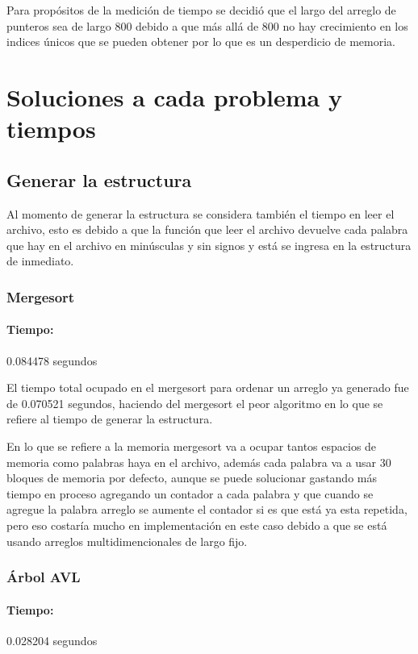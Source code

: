 \documentclass[12pt,letterpaper]{scrartcl}
\begin{document}
Para propósitos de la medición de tiempo se decidió que el largo del arreglo de punteros sea de largo 800 debido a que más allá de 800 no hay crecimiento en los indices únicos que se pueden obtener por lo que es un desperdicio de memoria.

\newpage
\section{Soluciones a cada problema y tiempos}

\subsection{Generar la estructura}

Al momento de generar la estructura se considera también el tiempo en leer el archivo, esto es debido a que la función que leer el archivo devuelve cada palabra que hay en el archivo en minúsculas y sin signos y está se ingresa en la estructura de inmediato.


\subsubsection{Mergesort}

\paragraph{Tiempo:} 0.084478 segundos

El tiempo total ocupado en el mergesort para ordenar un arreglo ya generado fue de 0.070521 segundos, haciendo del mergesort el peor algoritmo en lo que se refiere al tiempo de generar la estructura.

En lo que se refiere a la memoria mergesort va a ocupar tantos espacios de memoria como palabras haya en el archivo, además cada palabra va a usar 30 bloques de memoria por defecto, aunque se puede solucionar gastando más tiempo en proceso agregando un contador a cada palabra y que cuando se agregue la palabra arreglo se aumente el contador si es que está ya esta repetida, pero eso costaría mucho en implementación en este caso debido a que se está usando arreglos multidimencionales de largo fijo.

\subsubsection{Árbol AVL}

\paragraph{Tiempo:} 0.028204 segundos
\end{document}
